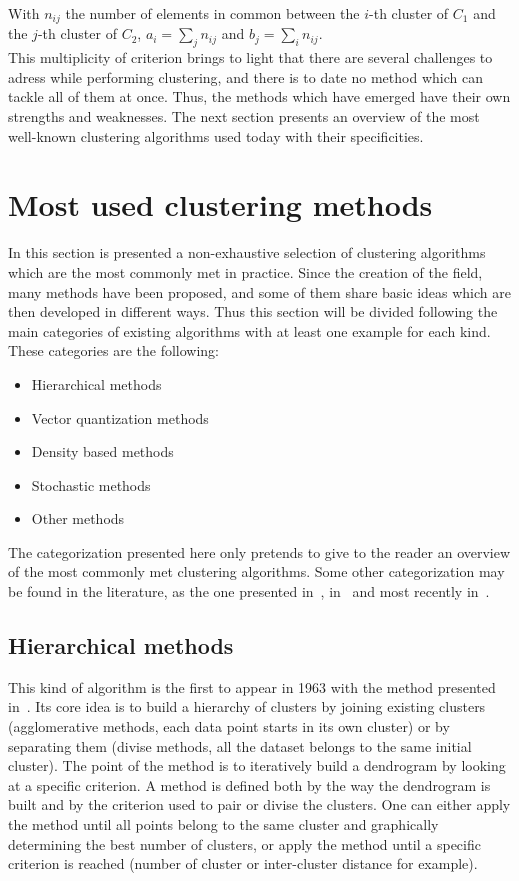 \documentclass[a4paper]{report}
\begin{document}
    With $n_{ij}$ the number of elements in common between the $i$-th cluster of $C_1$ and the $j$-th cluster of $C_2$, $a_i = \sum_j n_{ij}$ and $b_j = \sum_i n_{ij}$.\\

    This multiplicity of criterion brings to light that there are several challenges to adress while performing clustering, and there is to date no method which can tackle all of them at once. Thus, the methods which have emerged have their own strengths and weaknesses. The next section presents an overview of the most well-known clustering algorithms used today with their specificities.

    \section{Most used clustering methods}

    In this section is presented a non-exhaustive selection of clustering algorithms which are the most commonly met in practice. Since the creation of the field, many methods have been proposed, and some of them share basic ideas which are then developed in different ways. Thus this section will be divided following the main categories of existing algorithms with at least one example for each kind. These categories are the following:

    \begin{itemize}
        \item Hierarchical methods
        \item Vector quantization methods
        \item Density based methods
        \item Stochastic methods
        \item Other methods 
    \end{itemize}

    The categorization presented here only pretends to give to the reader an overview of the most commonly met clustering algorithms. Some other categorization may be found in the literature, as the one presented in~\cite{jain1999data}, in~\cite{xu2005survey} and most recently in~\cite{fahad2014survey}.

    \subsection{Hierarchical methods}

    This kind of algorithm is the first to appear in 1963 with the method presented in~\cite{ward1963hierarchical}. Its core idea is to build a hierarchy of clusters by joining existing clusters (agglomerative methods, each data point starts in its own cluster) or by separating them (divise methods, all the dataset belongs to the same initial cluster). The point of the method is to iteratively build a dendrogram by looking at a specific criterion. A method is defined both by the way the dendrogram is built and by the criterion used to pair or divise the clusters. One can either apply the method until all points belong to the same cluster and graphically determining the best number of clusters, or apply the method until a specific criterion is reached (number of cluster or inter-cluster distance for example).
\end{document}
